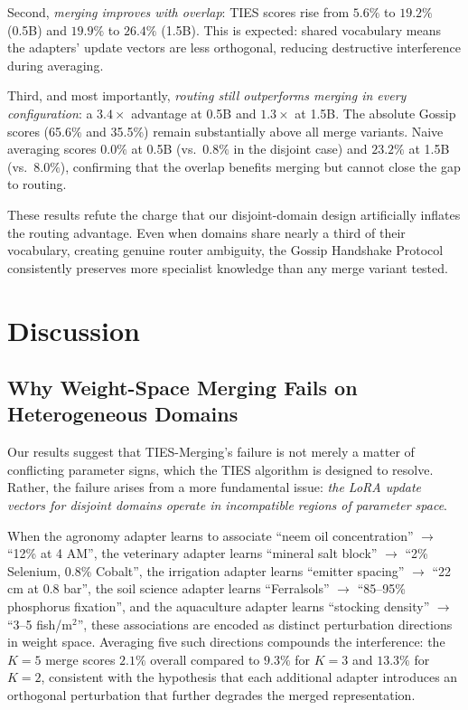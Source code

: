 \documentclass[conference, 10pt]{IEEEtran}
\begin{document}
Second, \emph{merging improves with overlap}: TIES scores rise from
$5.6\%$ to $19.2\%$ (0.5B) and $19.9\%$ to $26.4\%$ (1.5B).
This is expected: shared vocabulary means the adapters' update vectors
are less orthogonal, reducing destructive interference during averaging.

Third, and most importantly, \emph{routing still outperforms merging in
every configuration}: a $3.4\times$ advantage at 0.5B and $1.3\times$
at 1.5B. The absolute Gossip scores (65.6\% and 35.5\%) remain
substantially above all merge variants. Naive averaging scores $0.0\%$
at 0.5B (vs.\ $0.8\%$ in the disjoint case) and $23.2\%$ at 1.5B
(vs.\ $8.0\%$), confirming that the overlap benefits merging but
cannot close the gap to routing.

These results refute the charge that our disjoint-domain design
artificially inflates the routing advantage. Even when domains share
nearly a third of their vocabulary, creating genuine router
ambiguity, the Gossip Handshake Protocol consistently preserves more
specialist knowledge than any merge variant tested.

\section{Discussion}
\label{sec:discussion}

\subsection{Why Weight-Space Merging Fails on Heterogeneous Domains}

Our results suggest that TIES-Merging's failure is not merely a matter
of conflicting parameter signs, which the TIES algorithm is designed to
resolve. Rather, the failure arises from a more fundamental issue:
\emph{the LoRA update vectors for disjoint domains operate in
incompatible regions of parameter space}.

When the agronomy adapter learns to associate ``neem oil concentration''
$\to$ ``12\% at 4 AM'', the veterinary adapter learns ``mineral
salt block'' $\to$ ``2\% Selenium, 0.8\% Cobalt'', the irrigation
adapter learns ``emitter spacing'' $\to$ ``22 cm at 0.8 bar'',
the soil science adapter learns ``Ferralsols'' $\to$ ``85--95\%
phosphorus fixation'', and the aquaculture adapter learns ``stocking
density'' $\to$ ``3--5 fish/m$^2$'',
these associations are encoded as distinct perturbation directions in
weight space.
Averaging five such directions compounds the interference:
the $K=5$ merge scores $2.1\%$ overall compared to $9.3\%$ for
$K=3$ and $13.3\%$ for $K=2$, consistent with the hypothesis that
each additional adapter introduces an orthogonal perturbation that
further degrades the merged representation.
\end{document}
